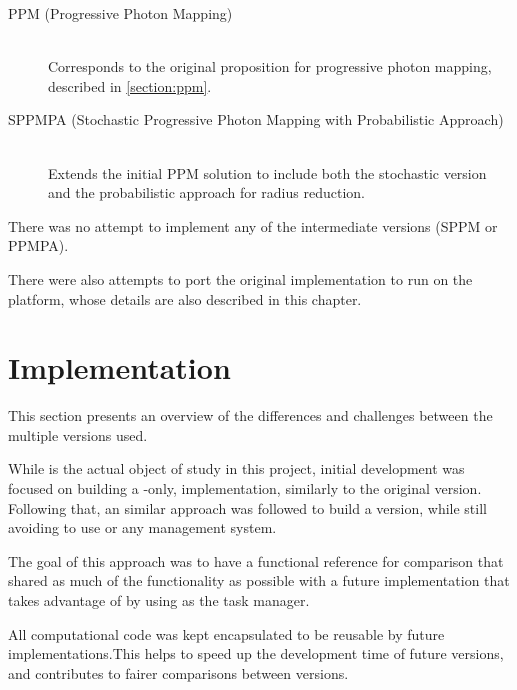 \documentclass[main.tex]{subfiles}
\begin{document}
\begin{description}
\item[PPM (Progressive Photon Mapping)] \hfill \\
  Corresponds to the original proposition for progressive photon mapping, described in \cref{section:ppm}.

\item[SPPMPA (Stochastic Progressive Photon Mapping with Probabilistic Approach)] \hfill \\
  Extends the initial PPM solution to include both the stochastic version and the probabilistic approach for radius reduction.
\end{description}

There was no attempt to implement any of the intermediate versions (SPPM or PPMPA).

There were also attempts to port the original implementation to run on the \mic platform, whose details are also described in this chapter.




\section{Implementation}

This section presents an overview of the differences and challenges between the multiple versions used.

While \starpu is the actual object of study in this project, initial development was focused on building a \cpu-only, implementation, similarly to the original version. Following that, an similar approach was followed to build a \cuda version, while still avoiding to use \starpu or any \hetplat management system.

The goal of this approach was to have a functional reference for comparison that shared as much of the functionality as possible with a future implementation that takes advantage of \hetplats by using \starpu as the task manager.

All computational code was kept encapsulated to be reusable by future implementations.This helps to speed up the development time of future versions, and contributes to fairer comparisons between versions.






\end{document}
